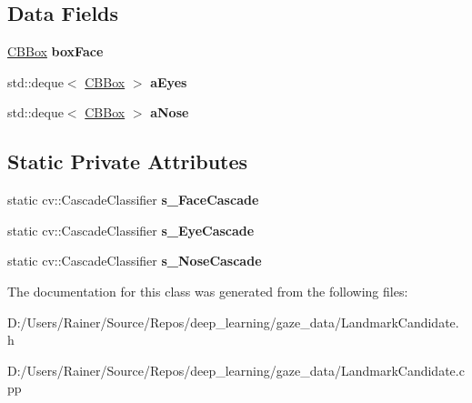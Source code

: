 \subsection*{Data Fields}
\begin{DoxyCompactItemize}
\item 
\mbox{\label{class_c_landmark_candidate_a3e7f2980b5aa2391887a895e54095d7a}} 
\hyperlink{class_c_b_box}{C\+B\+Box} {\bfseries box\+Face}
\item 
\mbox{\label{class_c_landmark_candidate_a18d3fb522bdfec99bd15c4af8b92941a}} 
std\+::deque$<$ \hyperlink{class_c_b_box}{C\+B\+Box} $>$ {\bfseries a\+Eyes}
\item 
\mbox{\label{class_c_landmark_candidate_a42a62cdec3aeb26cf865cad16bc9b357}} 
std\+::deque$<$ \hyperlink{class_c_b_box}{C\+B\+Box} $>$ {\bfseries a\+Nose}
\end{DoxyCompactItemize}
\subsection*{Static Private Attributes}
\begin{DoxyCompactItemize}
\item 
\mbox{\label{class_c_landmark_candidate_ab0631d51dcc7b72619bf32373bbdc58c}} 
static cv\+::\+Cascade\+Classifier {\bfseries s\+\_\+\+Face\+Cascade}
\item 
\mbox{\label{class_c_landmark_candidate_aec8d39f6402507d22b9e4df0f4da5fb7}} 
static cv\+::\+Cascade\+Classifier {\bfseries s\+\_\+\+Eye\+Cascade}
\item 
\mbox{\label{class_c_landmark_candidate_a7334544231cedee6e25eba4ab946b983}} 
static cv\+::\+Cascade\+Classifier {\bfseries s\+\_\+\+Nose\+Cascade}
\end{DoxyCompactItemize}


The documentation for this class was generated from the following files\+:\begin{DoxyCompactItemize}
\item 
D\+:/\+Users/\+Rainer/\+Source/\+Repos/deep\+\_\+learning/gaze\+\_\+data/Landmark\+Candidate.\+h\item 
D\+:/\+Users/\+Rainer/\+Source/\+Repos/deep\+\_\+learning/gaze\+\_\+data/Landmark\+Candidate.\+cpp\end{DoxyCompactItemize}
